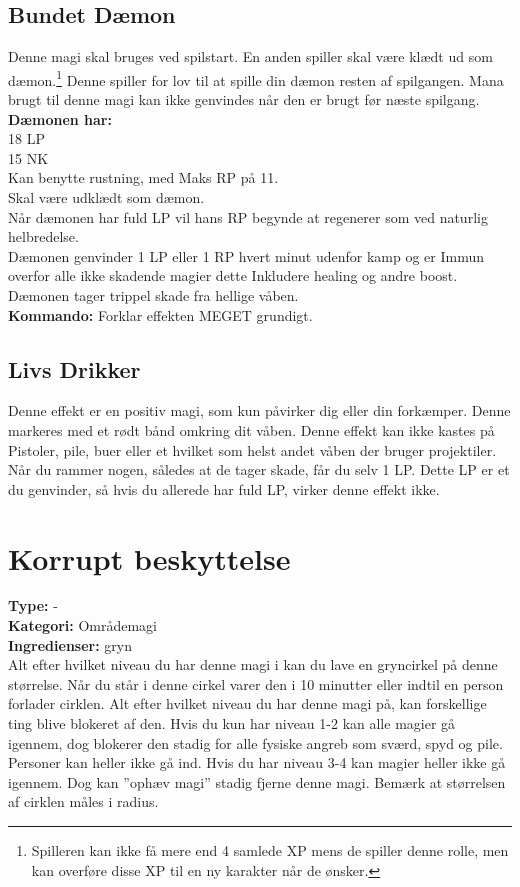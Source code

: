 \subsection{Bundet Dæmon}
Denne magi skal bruges ved spilstart. En anden spiller skal være klædt ud som dæmon.\footnote{Spilleren kan ikke få mere end 4 samlede XP mens de spiller denne rolle, men kan overføre disse XP til en ny karakter når de ønsker.} Denne spiller for lov til at spille din dæmon resten af spilgangen. Mana brugt til denne magi kan ikke genvindes når den er brugt før næste spilgang.\\
\textbf{Dæmonen har:}\\
18 LP\\ 
15 NK\\
Kan benytte rustning, med Maks RP på 11.\\
Skal være udklædt som dæmon.\\
Når dæmonen har fuld LP vil hans RP begynde at regenerer som ved naturlig helbredelse.\\ 
Dæmonen genvinder 1 LP eller 1 RP hvert minut udenfor kamp og er Immun overfor alle ikke skadende magier dette Inkludere healing og andre boost.\\
Dæmonen tager trippel skade fra hellige våben.\\
\textbf{Kommando:} Forklar effekten MEGET grundigt.

\subsection{Livs Drikker}
Denne effekt er en positiv magi, som kun påvirker dig eller din forkæmper. Denne markeres med et rødt bånd omkring dit våben. Denne effekt kan ikke kastes på Pistoler, pile, buer eller et hvilket som helst andet våben der bruger projektiler.\\ 
Når du rammer nogen, således at de tager skade, får du selv 1 LP. Dette LP er et du genvinder, så hvis du allerede har fuld LP, virker denne effekt ikke.\\

\section{Korrupt beskyttelse}
\textbf{Type:} - \\
\textbf{Kategori:} Områdemagi\\
\textbf{Ingredienser:} gryn\\
Alt efter hvilket niveau du har denne magi i kan du lave en gryncirkel på denne størrelse. Når du står i denne cirkel varer den i 10 minutter eller indtil en person forlader cirklen. Alt efter hvilket niveau du har denne magi på, kan forskellige ting blive blokeret af den. Hvis du kun har niveau 1-2 kan alle magier gå igennem, dog blokerer den stadig for alle fysiske angreb som sværd, spyd og pile. Personer kan heller ikke gå ind. Hvis du har niveau 3-4 kan magier heller ikke gå igennem. Dog kan ”ophæv magi” stadig fjerne denne magi. Bemærk at størrelsen af cirklen måles i radius.
